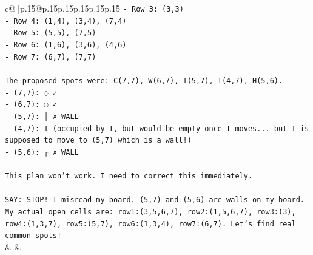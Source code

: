 \documentclass{article}
\begin{document}
{\begin{supertabular}{c@{$\;$}|p{.15\linewidth}@{}p{.15\linewidth}p{.15\linewidth}p{.15\linewidth}p{.15\linewidth}p{.15\linewidth}}
{{{\texttt{{-} Row 3: (3,3)} \\
\texttt{{-} Row 4: (1,4), (3,4), (7,4)} \\
\texttt{{-} Row 5: (5,5), (7,5)} \\
\texttt{{-} Row 6: (1,6), (3,6), (4,6)} \\
\texttt{{-} Row 7: (6,7), (7,7)} \\
\\ 
\texttt{The proposed spots were: C(7,7), W(6,7), I(5,7), T(4,7), H(5,6).} \\
\texttt{{-} (7,7): ◌ ✓} \\
\texttt{{-} (6,7): ◌ ✓} \\
\texttt{{-} (5,7): │ ✗ WALL} \\
\texttt{{-} (4,7): I (occupied by I, but would be empty once I moves... but I is supposed to move to (5,7) which is a wall!)} \\
\texttt{{-} (5,6): ┌ ✗ WALL} \\
\\ 
\texttt{This plan won't work. I need to correct this immediately.} \\
\\ 
\texttt{SAY: STOP! I misread my board. (5,7) and (5,6) are walls on my board. My actual open cells are: row1:(3,5,6,7), row2:(1,5,6,7), row3:(3), row4:(1,3,7), row5:(5,7), row6:(1,3,4), row7:(6,7). Let's find real common spots!} \\
            }
        }
    }
    & & \\ \\


\end{supertabular}}
\end{document}
